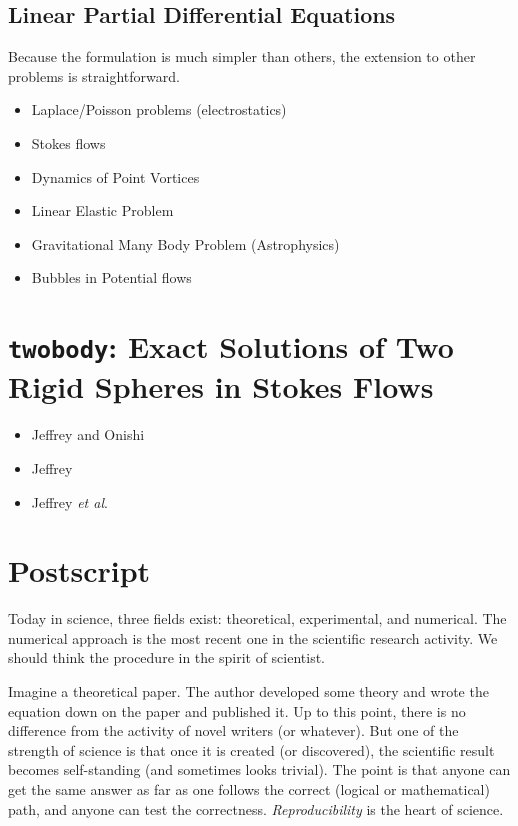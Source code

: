 \documentclass{book}
\begin{document}
\section{Linear Partial Differential Equations}
Because the formulation is much simpler than others,
the extension to other problems is straightforward.

\begin{itemize}
\item Laplace/Poisson problems (electrostatics)
\item Stokes flows
\item Dynamics of Point Vortices
\item Linear Elastic Problem
\item Gravitational Many Body Problem (Astrophysics)
\item Bubbles in Potential flows
\end{itemize}



\chapter{{\tt twobody}:
  Exact Solutions of Two Rigid Spheres in Stokes Flows}
\label{chp:twobody}

\begin{itemize}
\item Jeffrey and Onishi\cite{JeffreyOnishi1984}
\item Jeffrey\cite{jeffrey1992}
\item Jeffrey {\it et al}.\cite{jeffrey1993}
\end{itemize}



\chapter{Postscript}
Today in science, three fields exist:
theoretical, experimental, and numerical.
The numerical approach is the most recent one
in the scientific research activity.
We should think the procedure in the spirit of scientist.

Imagine a theoretical paper. The author developed some 
theory and wrote the equation down on the paper and published it.
Up to this point, there is no difference from
the activity of novel writers (or whatever).
But one of the strength of science is that
once it is created (or discovered),
the scientific result becomes self-standing
(and sometimes looks trivial).
The point is that anyone can get the same answer
as far as one follows the correct (logical or mathematical)
path, and anyone can test the correctness.
{\it Reproducibility} is the heart of science.
\end{document}
